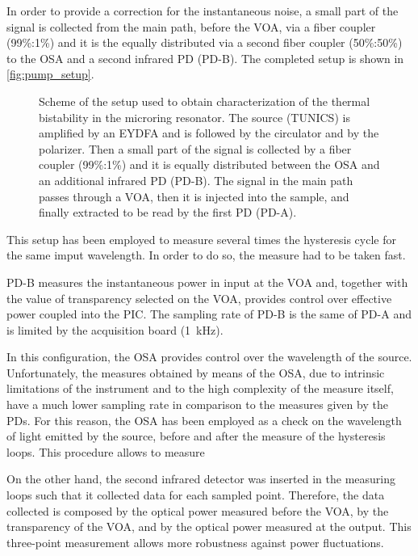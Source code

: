 In order to provide a correction for the instantaneous noise, a small part of the signal is collected from the main path, before the VOA, via a fiber coupler (99\%:1\%) and it is the equally distributed via a second fiber coupler (50\%:50\%) to the OSA and a second infrared \ac{PD} (PD-B).
The completed setup is shown in \autoref{fig:pump_setup}.

\begin{figure}[hbtp]
	\centering
	
	\caption{Scheme of the setup used to obtain characterization of the thermal bistability in the microring resonator.
		The source (TUNICS) is amplified by an \acs{EYDFA} and is followed by the circulator and by the polarizer.
		Then a small part of the signal is collected by a fiber coupler (99\%:1\%) and it is equally distributed between the OSA and an additional infrared \ac{PD} (PD-B).
		The signal in the main path passes through a \acf{VOA}, then it is injected into the sample, and finally extracted to be read by the first \ac{PD} (PD-A).
		}
	\label{fig:pump_setup}
\end{figure}

This setup has been employed to measure several times the hysteresis cycle for the same imput wavelength.
In order to do so, the measure had to be taken fast.

PD-B measures the instantaneous power in input at the VOA and, together with the value of transparency selected on the VOA, provides control over effective power coupled into the \ac{PIC}.
The sampling rate of PD-B is the same of PD-A and is limited by the acquisition board (\SI{1}{\kHz}).

In this configuration, the \ac{OSA} provides control over the wavelength of the source.
Unfortunately, the measures obtained by means of the \ac{OSA}, due to intrinsic limitations of the instrument and to the high complexity of the measure itself, have a much lower sampling rate in comparison to the measures given by the \acp{PD}.
For this reason, the \ac{OSA} has been employed as a check on the wavelength of light emitted by the source, before and after the measure of the hysteresis loops.
This procedure allows to measure

On the other hand, the second infrared detector was inserted in the measuring loops such that it collected data for each sampled point.
Therefore, the data collected is composed by the optical power measured before the \ac{VOA}, by the transparency of the \ac{VOA}, and by the optical power measured at the output.
This three-point measurement allows more robustness against power fluctuations.

